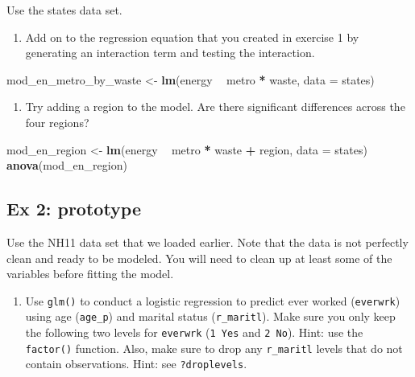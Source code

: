 \documentclass[]{book}
\newenvironment{Shaded}{\begin{snugshade}}{\end{snugshade}}
\newcommand{\KeywordTok}[1]{\textcolor[rgb]{0.13,0.29,0.53}{\textbf{#1}}}
\newcommand{\DataTypeTok}[1]{\textcolor[rgb]{0.13,0.29,0.53}{#1}}
\newcommand{\StringTok}[1]{\textcolor[rgb]{0.31,0.60,0.02}{#1}}
\newcommand{\OperatorTok}[1]{\textcolor[rgb]{0.81,0.36,0.00}{\textbf{#1}}}
\newcommand{\NormalTok}[1]{#1}
\providecommand{\tightlist}{%
  \setlength{\itemsep}{0pt}\setlength{\parskip}{0pt}}
\begin{document}
Use the states data set.

\begin{enumerate}
\def\labelenumi{\arabic{enumi}.}
\tightlist
\item
  Add on to the regression equation that you created in exercise 1 by
  generating an interaction term and testing the interaction.
\end{enumerate}

\begin{Shaded}
\begin{Highlighting}[]
\NormalTok{  mod_en_metro_by_waste <-}\StringTok{ }\KeywordTok{lm}\NormalTok{(energy }\OperatorTok{~}\StringTok{ }\NormalTok{metro }\OperatorTok{*}\StringTok{ }\NormalTok{waste, }\DataTypeTok{data =}\NormalTok{ states)}
\end{Highlighting}
\end{Shaded}

\begin{enumerate}
\def\labelenumi{\arabic{enumi}.}
\setcounter{enumi}{1}
\tightlist
\item
  Try adding a region to the model. Are there significant differences
  across the four regions?
\end{enumerate}

\begin{Shaded}
\begin{Highlighting}[]
\NormalTok{  mod_en_region <-}\StringTok{ }\KeywordTok{lm}\NormalTok{(energy }\OperatorTok{~}\StringTok{ }\NormalTok{metro }\OperatorTok{*}\StringTok{ }\NormalTok{waste }\OperatorTok{+}\StringTok{ }\NormalTok{region, }\DataTypeTok{data =}\NormalTok{ states)}
  \KeywordTok{anova}\NormalTok{(mod_en_region)}
\end{Highlighting}
\end{Shaded}

\subsection{Ex 2: prototype}\label{ex-2-prototype}

Use the NH11 data set that we loaded earlier. Note that the data is not
perfectly clean and ready to be modeled. You will need to clean up at
least some of the variables before fitting the model.

\begin{enumerate}
\def\labelenumi{\arabic{enumi}.}
\tightlist
\item
  Use \texttt{glm()} to conduct a logistic regression to predict ever
  worked (\texttt{everwrk}) using age (\texttt{age\_p}) and marital
  status (\texttt{r\_maritl}). Make sure you only keep the following two
  levels for \texttt{everwrk} (\texttt{1\ Yes} and \texttt{2\ No}).
  Hint: use the \texttt{factor()} function. Also, make sure to drop any
  \texttt{r\_maritl} levels that do not contain observations. Hint: see
  \texttt{?droplevels}.
\end{enumerate}
\end{document}
